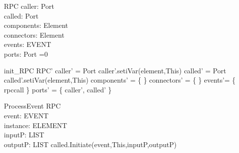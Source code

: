 \begin{schema}{RPC}
caller:  Port \\
called: Port \\
components: \pset Element \\
connectors: \pset Element \\
events: \pset EVENT \\
ports: \pset Port
=0
\end{schema}


\begin{zed}
init\_RPC \sdef \lsch RPC' \bbar caller' = \new Port \land caller'.setiVar(element,This) \land called' = \new Port \land called'.setiVar(element,This) \land  components' = \{ \} \land  connectors' = \{ \} \land events'= \{ rpccall \} \land ports' = \{ caller', called' \} \rsch  \end{zed}

\begin{schema}{ProcessEvent}
\Delta RPC \\
event: EVENT \\
instance: ELEMENT \\
inputP: LIST \\
outputP: LIST
\where called.Initiate(event,This,inputP,outputP)
\end{schema}
